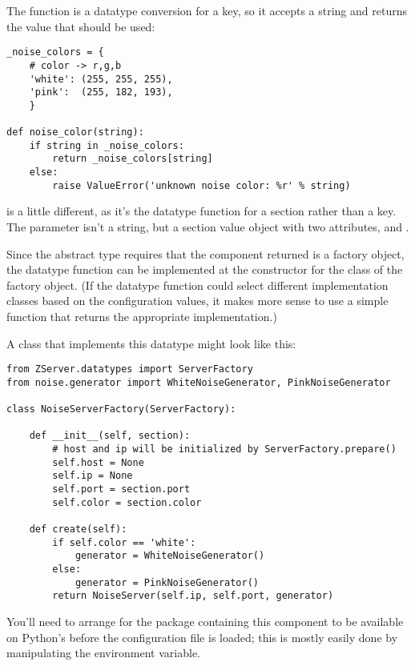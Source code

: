 \documentclass{howto}
\newcommand{\datatype}[1]{\strong{#1}}
\begin{document}
The  function is a datatype conversion for a
key, so it accepts a string and returns the value that should be used:

\begin{verbatim}
_noise_colors = {
    # color -> r,g,b
    'white': (255, 255, 255),
    'pink':  (255, 182, 193),
    }

def noise_color(string):
    if string in _noise_colors:
        return _noise_colors[string]
    else:
        raise ValueError('unknown noise color: %r' % string)
\end{verbatim}

 is a little different, as it's the datatype
function for a section rather than a key.  The parameter isn't a
string, but a section value object with two attributes, 
and .

Since the \datatype{ZServer.server} abstract type requires that the
component returned is a factory object, the datatype function can be
implemented at the constructor for the class of the factory object.
(If the datatype function could select different implementation
classes based on the configuration values, it makes more sense to use
a simple function that returns the appropriate implementation.)

A class that implements this datatype might look like this:

\begin{verbatim}
from ZServer.datatypes import ServerFactory
from noise.generator import WhiteNoiseGenerator, PinkNoiseGenerator

class NoiseServerFactory(ServerFactory):

    def __init__(self, section):
        # host and ip will be initialized by ServerFactory.prepare()
        self.host = None
        self.ip = None
        self.port = section.port
        self.color = section.color

    def create(self):
        if self.color == 'white':
            generator = WhiteNoiseGenerator()
        else:
            generator = PinkNoiseGenerator()
        return NoiseServer(self.ip, self.port, generator)
\end{verbatim}

You'll need to arrange for the package containing this component to be
available on Python's  before the configuration file is
loaded; this is mostly easily done by manipulating the
 environment variable.
\end{document}
